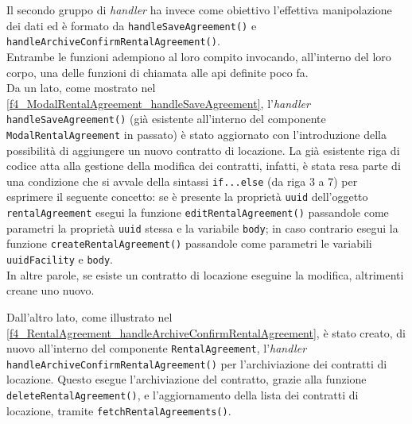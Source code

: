 
Il secondo gruppo di \textit{handler} ha invece come obiettivo l'effettiva manipolazione dei dati ed è formato da \texttt{handleSaveAgreement()} e \texttt{handleArchiveConfirmRentalAgreement()}.\\
Entrambe le funzioni adempiono al loro compito invocando, all'interno del loro corpo, una delle funzioni di chiamata alle \acrshort{api} definite poco fa.\\
Da un lato, come mostrato nel \autoref{f4_ModalRentalAgreement_handleSaveAgreement}, l'\textit{handler} \texttt{handleSaveAgreement()} (già esistente all'interno del componente \texttt{ModalRentalAgreement} in passato) è stato aggiornato con l'introduzione della possibilità di aggiungere un nuovo contratto di locazione. La già esistente riga di codice atta alla gestione della modifica dei contratti, infatti, è stata resa parte di una condizione che si avvale della sintassi \texttt{if...else} (da riga 3 a 7) per esprimere il seguente concetto: se è presente la proprietà \texttt{uuid} dell'oggetto \texttt{rentalAgreement} esegui la funzione \texttt{editRentalAgreement()} passandole come parametri la proprietà \texttt{uuid} stessa e la variabile \texttt{body}; in caso contrario esegui la funzione \texttt{createRentalAgreement()} passandole come parametri le variabili \texttt{uuidFacility} e \texttt{body}.\\
In altre parole, se esiste un contratto di locazione eseguine la modifica, altrimenti creane uno nuovo.


Dall'altro lato, come illustrato nel \autoref{f4_RentalAgreement_handleArchiveConfirmRentalAgreement}, è stato creato, di nuovo all'interno del componente \texttt{RentalAgreement}, l'\textit{handler} \texttt{handleArchiveConfirmRentalAgreement()} per l'archiviazione dei contratti di locazione. Questo esegue l'archiviazione del contratto, grazie alla funzione \texttt{deleteRentalAgreement()}, e l'aggiornamento della lista dei contratti di locazione, tramite \texttt{fetchRentalAgreements()}.



